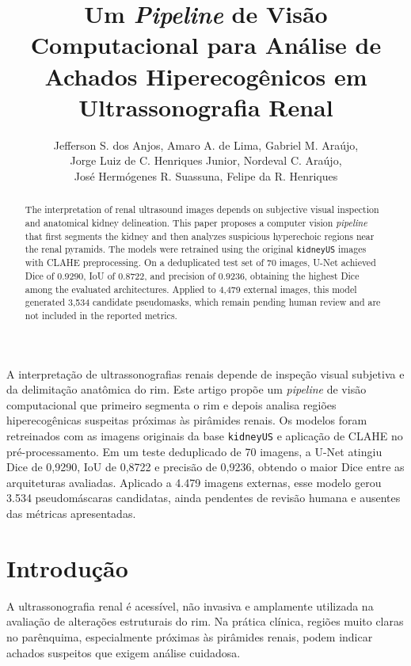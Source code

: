 \documentclass[12pt]{article}
\title{Um \textit{Pipeline} de Visão Computacional para Análise de Achados Hiperecogênicos em Ultrassonografia Renal}
\author{
  Jefferson S. dos Anjos\inst{1}, Amaro A. de Lima\inst{1},
  Gabriel M. Araújo\inst{1},\\ Jorge Luiz de C. Henriques Junior\inst{2},
  Nordeval C. Araújo\inst{2},\\ José Hermógenes R. Suassuna\inst{2}, Felipe da R. Henriques\inst{1}
}
\begin{document}
\maketitle

\begin{abstract}
The interpretation of renal ultrasound images depends on subjective visual inspection and anatomical kidney delineation. This paper proposes a computer vision \textit{pipeline} that first segments the kidney and then analyzes suspicious hyperechoic regions near the renal pyramids. The models were retrained using the original \texttt{kidneyUS} images with CLAHE preprocessing. On a deduplicated test set of 70 images, U-Net achieved Dice of 0.9290, IoU of 0.8722, and precision of 0.9236, obtaining the highest Dice among the evaluated architectures. Applied to 4,479 external images, this model generated 3,534 candidate pseudomasks, which remain pending human review and are not included in the reported metrics. %
\end{abstract}

\begin{resumo}
A interpretação de ultrassonografias renais depende de inspeção visual subjetiva e da delimitação anatômica do rim. Este artigo propõe um \textit{pipeline} de visão computacional que primeiro segmenta o rim e depois analisa regiões hiperecogênicas suspeitas próximas às pirâmides renais. Os modelos foram retreinados com as imagens originais da base \texttt{kidneyUS} e aplicação de CLAHE no pré-processamento. Em um teste deduplicado de 70 imagens, a U-Net atingiu Dice de 0,9290, IoU de 0,8722 e precisão de 0,9236, obtendo o maior Dice entre as arquiteturas avaliadas. Aplicado a 4.479 imagens externas, esse modelo gerou 3.534 pseudomáscaras candidatas, ainda pendentes de revisão humana e ausentes das métricas apresentadas. %
\end{resumo}

\section{Introdução}

A ultrassonografia renal é acessível, não invasiva e amplamente utilizada na avaliação de alterações estruturais do rim. Na prática clínica, regiões muito claras no parênquima, especialmente próximas às pirâmides renais, podem indicar achados suspeitos que exigem análise cuidadosa.
\end{document}
